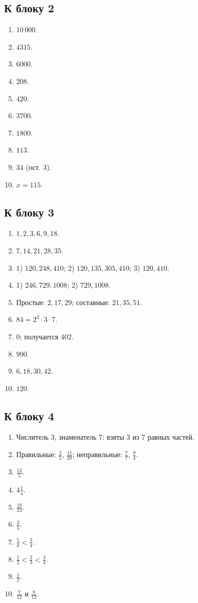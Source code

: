 \documentclass[12pt,a4paper]{article}
\begin{document}
\subsection*{К блоку 2}
\begin{enumerate}
  \item $10\,000$.
  \item $4315$.
  \item $6000$.
  \item $208$.
  \item $420$.
  \item $3700$.
  \item $1800$.
  \item $113$.
  \item $34$ (ост. $3$).
  \item $x=115$.
\end{enumerate}

\subsection*{К блоку 3}
\begin{enumerate}
  \item $1,2,3,6,9,18$.
  \item $7,14,21,28,35$.
  \item 1) $120,248,410$; 2) $120,135,305,410$; 3) $120,410$.
  \item 1) $246,729,1008$; 2) $729,1008$.
  \item Простые: $2,17,29$; составные: $21,35,51$.
  \item $84=2^2\cdot3\cdot7$.
  \item $0$; получается $402$.
  \item $990$.
  \item $6,18,30,42$.
  \item $120$.
\end{enumerate}

\subsection*{К блоку 4}
\begin{enumerate}
  \item Числитель $3$, знаменатель $7$: взяты $3$ из $7$ равных частей.
  \item Правильные: $\frac35$, $\frac{11}{20}$; неправильные: $\frac77$, $\frac94$.
  \item $\frac{13}{5}$.
  \item $4\frac14$.
  \item $\frac{18}{24}$.
  \item $\frac35$.
  \item $\frac58<\frac34$.
  \item $\frac12<\frac23<\frac34$.
  \item $\frac12$.
  \item $\frac7{12}$ и $\frac8{12}$.
\end{enumerate}
\end{document}
